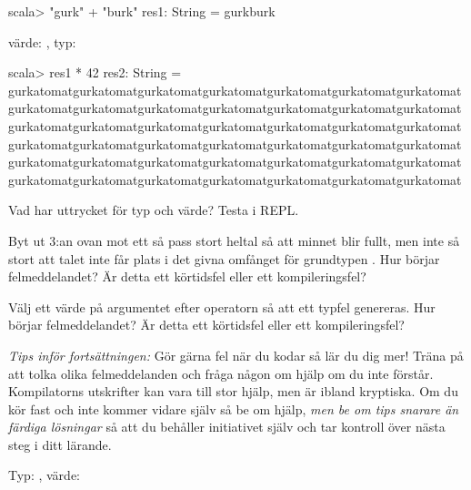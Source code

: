\SOLUTION

\TaskSolved \what

\SubtaskSolved
\begin{REPLnonum}
scala> "gurk" + "burk"
res1: String = gurkburk
\end{REPLnonum}
värde: , typ:  

\SubtaskSolved
\begin{REPLnonum}
scala> res1 * 42
res2: String = gurkatomatgurkatomatgurkatomatgurkatomatgurkatomatgurkatomatgurkatomatgurkatomatgurkatomatgurkatomatgurkatomatgurkatomatgurkatomatgurkatomatgurkatomatgurkatomatgurkatomatgurkatomatgurkatomatgurkatomatgurkatomatgurkatomatgurkatomatgurkatomatgurkatomatgurkatomatgurkatomatgurkatomatgurkatomatgurkatomatgurkatomatgurkatomatgurkatomatgurkatomatgurkatomatgurkatomatgurkatomatgurkatomatgurkatomatgurkatomatgurkatomatgurkatomat
\end{REPLnonum}

\QUESTEND




\QUESTBEGIN

\Task \what

\Subtask Vad har uttrycket  för typ och värde? Testa i REPL.

\Subtask Byt ut 3:an ovan mot ett så pass stort heltal så att minnet blir fullt, 
men inte så stort att talet inte får plats i det givna omfånget för grundtypen . Hur börjar felmeddelandet? Är detta ett körtidsfel eller ett kompileringsfel?

\Subtask Välj ett värde på argumentet efter operatorn \code{*} så att ett typfel genereras. Hur börjar felmeddelandet? Är detta ett körtidsfel eller ett kompileringsfel?

\begin{framed}
\noindent\emph{Tips inför fortsättningen:} Gör gärna fel när du kodar så lär du dig mer! Träna på att tolka olika felmeddelanden och fråga någon om hjälp om du inte förstår. Kompilatorns utskrifter kan vara till stor hjälp, men är ibland kryptiska. Om du kör fast och inte kommer vidare själv så be om hjälp, \emph{men be om tips snarare än färdiga lösningar} så att du behåller initiativet själv och tar kontroll över nästa steg i ditt lärande.
\end{framed}


\SOLUTION

\TaskSolved \what

\SubtaskSolved Typ: , värde: 

